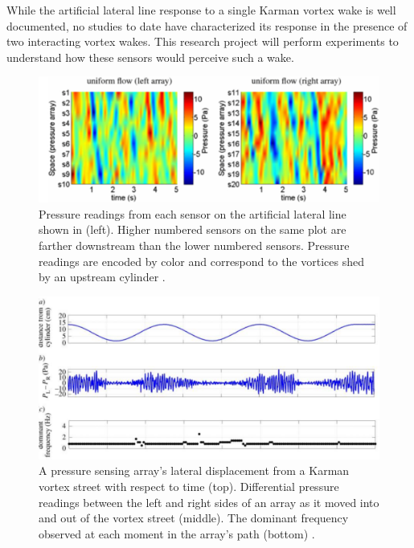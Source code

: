     While the artificial lateral line response to a single Karman vortex wake is well documented, no studies to date have characterized its response in the presence of two interacting vortex wakes. This research project will perform experiments to understand how these sensors would perceive such a wake.
\begin{figure}
\begin{center}
\includegraphics[width=0.80\columnwidth]{figures/Venturelli Readings.PNG}
\end{center}
\caption{Pressure readings from each sensor on the artificial lateral line shown in (left). Higher numbered sensors on the same plot are farther downstream than the lower numbered sensors. Pressure readings are encoded by color and correspond to the vortices shed by an upstream cylinder \citep{Venturelli2012}.}
\label{fig:PW:Venturelli Results}
\end{figure}
\begin{figure}
\begin{center}
\includegraphics[width=0.80\columnwidth]{figures/Chambers Lateral Results.PNG}
\end{center}
\caption{A pressure sensing array's lateral displacement from a Karman vortex street with respect to time (top). Differential pressure readings between the left and right sides of an array as it moved into and out of the vortex street (middle). The dominant frequency observed at each moment in the array's path (bottom) \citep{Chambers2014}.}
\label{fig:PW:Chambers Results}
\end{figure}

